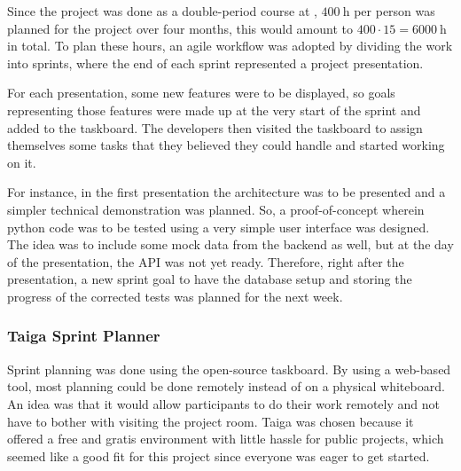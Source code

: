 Since the project was done as a double-period course at \LTU, $\SI{400}{\hour}$ per person was planned for the project over four months, this would amount to $400\cdot15=\SI{6000}{\hour}$ in total. To plan these hours, an agile workflow was adopted by dividing the work into sprints, where the end of each sprint represented a project presentation.

For each presentation, some new features were to be displayed, so goals representing those features were made up at the very start of the sprint and added to the taskboard. The developers then visited the taskboard to assign themselves some tasks that they believed they could handle and started working on it.

For instance, in the first presentation the architecture was to be presented and a simpler technical demonstration was planned. So, a proof-of-concept wherein python code was to be tested using a very simple user interface was designed. The idea was to include some mock data from the backend as well, but at the day of the presentation, the API was not yet ready. Therefore, right after the presentation, a new sprint goal to have the database setup and storing the progress of the corrected tests was planned for the next week.

\subsubsection{Taiga Sprint Planner}
Sprint planning was done using the open-source \taiga{} taskboard. By using a web-based tool, most planning could be done remotely instead of on a physical whiteboard. An idea was that it would allow participants to do their work remotely and not have to bother with visiting the project room. Taiga was chosen because it offered a free and gratis environment with little hassle for public projects, which seemed like a good fit for this project since everyone was eager to get started.

